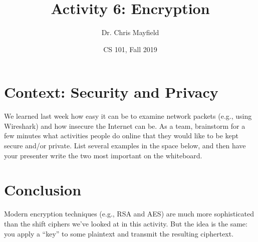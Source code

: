 \documentclass[12pt]{article}
\title{Activity 6: Encryption}
\author{Dr. Chris Mayfield}
\date{CS 101, Fall 2019}
\begin{document}
\maketitle

\section*{Context: Security and Privacy}

We learned last week how easy it can be to examine network packets (e.g., using Wireshark) and how insecure the Internet can be.
As a team, brainstorm for a few minutes what activities people do online that they would like to be kept secure and/or private.
List several examples in the space below, and then have your presenter write the two most important on the whiteboard.

\emptybox





\newpage



\vfill

\section*{Conclusion}

Modern encryption techniques (e.g., RSA and AES) are much more sophisticated than the shift ciphers we've looked at in this activity.
But the idea is the same: you apply a ``key'' to some plaintext and transmit the resulting ciphertext.
\end{document}
